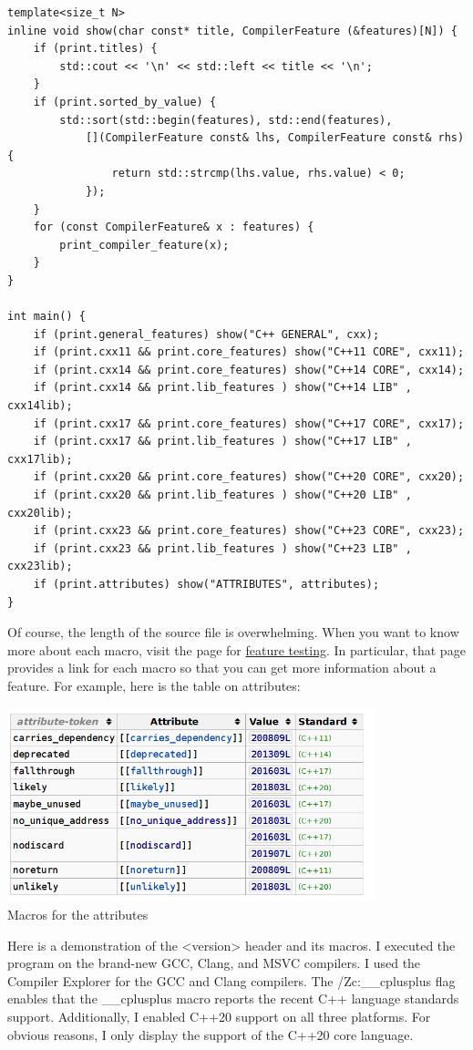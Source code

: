 \begin{lstlisting}[style=styleCXX]
template<size_t N>
inline void show(char const* title, CompilerFeature (&features)[N]) {
	if (print.titles) {
		std::cout << '\n' << std::left << title << '\n';
	}
	if (print.sorted_by_value) {
		std::sort(std::begin(features), std::end(features),
			[](CompilerFeature const& lhs, CompilerFeature const& rhs) {
				return std::strcmp(lhs.value, rhs.value) < 0;
			});
	}
	for (const CompilerFeature& x : features) {
		print_compiler_feature(x);
	}
}

int main() {
	if (print.general_features) show("C++ GENERAL", cxx);
	if (print.cxx11 && print.core_features) show("C++11 CORE", cxx11);
	if (print.cxx14 && print.core_features) show("C++14 CORE", cxx14);
	if (print.cxx14 && print.lib_features ) show("C++14 LIB" , cxx14lib);
	if (print.cxx17 && print.core_features) show("C++17 CORE", cxx17);
	if (print.cxx17 && print.lib_features ) show("C++17 LIB" , cxx17lib);
	if (print.cxx20 && print.core_features) show("C++20 CORE", cxx20);
	if (print.cxx20 && print.lib_features ) show("C++20 LIB" , cxx20lib);
	if (print.cxx23 && print.core_features) show("C++23 CORE", cxx23);
	if (print.cxx23 && print.lib_features ) show("C++23 LIB" , cxx23lib);
	if (print.attributes) show("ATTRIBUTES", attributes);
}
\end{lstlisting}

Of course, the length of the source file is overwhelming. When you want to know more about each macro, visit the page for \href{https://en.cppreference.com/w/cpp/feature_test}{feature testing}. In particular, that page provides a link for each macro so that you can get more information about a feature. For example, here is the table on attributes:

\begin{center}
\includegraphics[width=0.8\textwidth]{content/5/chapter9/images/2.png}\\
Macros for the attributes
\end{center}

Here is a demonstration of the <version> header and its macros. I executed the program on the brand-new GCC, Clang, and MSVC compilers. I used the Compiler Explorer for the GCC and Clang compilers. The /Zc:\_\_cplusplus flag enables that the \_\_cplusplus macro reports the recent C++ language standards support. Additionally, I enabled C++20 support on all three platforms. For obvious reasons, I only display the support of the C++20 core language.

